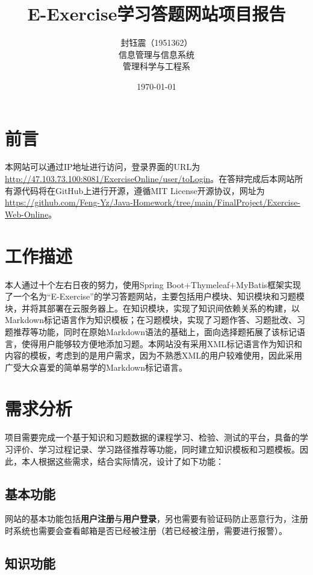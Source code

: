 \documentclass{nwafucoursepaper}
\title{\bfseries\sffamily E-Exercise学习答题网站项目报告}
\author{\zihao{4} \fangsong 封钰震（1951362）\\\fangsong 信息管理与信息系统 \\\small \songti 管理科学与工程系}
\date{\small \today}
\begin{document}
\maketitle
\thispagestyle{empty}

\section{前言}

本网站可以通过IP地址进行访问，登录界面的URL为\url{http://47.103.73.100:8081/ExerciseOnline/user/toLogin}。在答辩完成后本网站所有源代码将在GitHub上进行开源，遵循MIT License开源协议，网址为\url{https://github.com/Feng-Yz/Java-Homework/tree/main/FinalProject/Exercise-Web-Online}。

\section{工作描述}

本人通过十个左右日夜的努力，使用Spring Boot+Thymeleaf+MyBatis框架实现了一个名为“E-Exercise”的学习答题网站，主要包括用户模块、知识模块和习题模块，并将其部署在云服务器上。在知识模块，实现了知识间依赖关系的构建，以Markdown标记语言作为知识模板；在习题模块，实现了习题作答、习题批改、习题推荐等功能，同时在原始Markdown语法的基础上，面向选择题拓展了该标记语言，使得用户能够较方便地添加习题。本网站没有采用XML标记语言作为知识和内容的模板，考虑到的是用户需求，因为不熟悉XML的用户较难使用，因此采用广受大众喜爱的简单易学的Markdown标记语言。

\section{需求分析}

项目需要完成一个基于知识和习题数据的课程学习、检验、测试的平台，具备的学习评价、学习过程记录、学习路径推荐等功能，同时建立知识模板和习题模板。因此，本人根据这些需求，结合实际情况，设计了如下功能：

\subsection{基本功能}

网站的基本功能包括\textbf{用户注册}与\textbf{用户登录}，另也需要有验证码防止恶意行为，注册时系统也需要会查看邮箱是否已经被注册（若已经被注册，需要进行报警）。

\subsection{知识功能}
\end{document}
